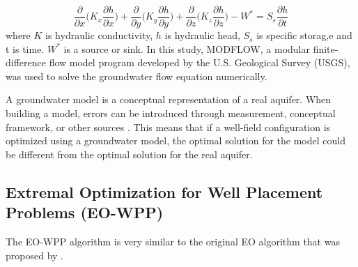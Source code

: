 \documentclass[authoryear]{elsarticle}
\begin{document}
\begin{equation}
 \frac{\partial }{\partial x}\big(K_x\frac{\partial h}{\partial x}\big)+\frac{\partial }{\partial y}\big(K_y\frac{\partial h}{\partial y}\big)+\frac{\partial }{\partial z}\big(K_z\frac{\partial h}{\partial z}\big)-W^* =S_s\frac{\partial h}{\partial t}
\end{equation}
where $K$ is hydraulic conductivity, $h$ is hydraulic head, $S_s$ is specific storag,e and t is time. $W^*$ is a source or sink. In this study, MODFLOW\citep{mcdonald2003history}, a modular finite-difference flow model program developed by the U.S. Geological Survey (USGS), was used to solve the groundwater flow equation numerically.

A groundwater model is a conceptual representation of a real aquifer. When building a model, errors can be introduced through measurement, conceptual framework, or other sources \citep{anderson2015applied}. This means that if a well-field configuration is optimized using a groundwater model, the optimal solution for the model could be different from the optimal solution for the real aquifer.  

\subsection{Extremal Optimization for Well Placement Problems (EO-WPP)}
The EO-WPP algorithm is very similar to the original EO algorithm that was proposed by \citet{boettcher1999extremal}. 
\end{document}
